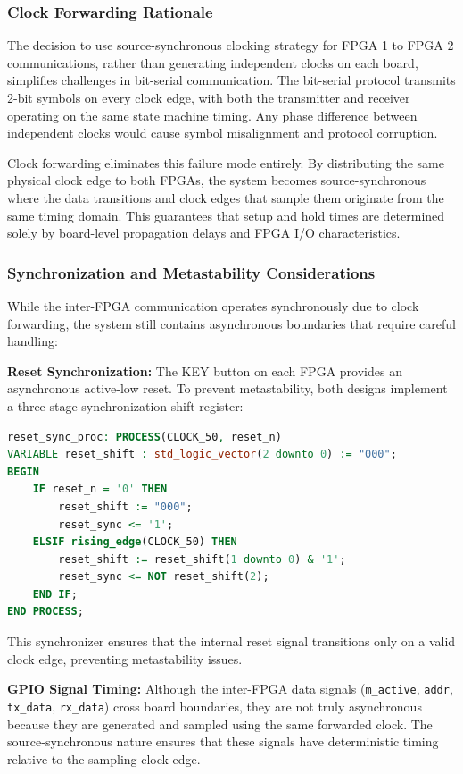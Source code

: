\documentclass[12pt]{article}
\begin{document}
\subsubsection{Clock Forwarding Rationale}
The decision to use source-synchronous clocking strategy for FPGA 1 to FPGA 2 communications, rather than generating independent clocks on each board, simplifies challenges in bit-serial communication. The bit-serial protocol transmits 2-bit symbols on every clock edge, with both the transmitter and receiver operating on the same state machine timing. Any phase difference between independent clocks would cause symbol misalignment and protocol corruption.

Clock forwarding eliminates this failure mode entirely. By distributing the same physical clock edge to both FPGAs, the system becomes source-synchronous where the data transitions and clock edges that sample them originate from the same timing domain. This guarantees that setup and hold times are determined solely by board-level propagation delays and FPGA I/O characteristics.

\subsubsection{Synchronization and Metastability Considerations}
While the inter-FPGA communication operates synchronously due to clock forwarding, the system still contains asynchronous boundaries that require careful handling:

\textbf{Reset Synchronization:} The KEY button on each FPGA provides an asynchronous active-low reset. To prevent metastability, both designs implement a three-stage synchronization shift register:

\begin{lstlisting}[language=VHDL]
reset_sync_proc: PROCESS(CLOCK_50, reset_n)
VARIABLE reset_shift : std_logic_vector(2 downto 0) := "000";
BEGIN
    IF reset_n = '0' THEN
        reset_shift := "000";
        reset_sync <= '1';
    ELSIF rising_edge(CLOCK_50) THEN
        reset_shift := reset_shift(1 downto 0) & '1';
        reset_sync <= NOT reset_shift(2);
    END IF;
END PROCESS;
\end{lstlisting}

This synchronizer ensures that the internal reset signal transitions only on a valid clock edge, preventing metastability issues.

\textbf{GPIO Signal Timing:} Although the inter-FPGA data signals (\texttt{m\_active}, \texttt{addr}, \texttt{tx\_data}, \texttt{rx\_data}) cross board boundaries, they are not truly asynchronous because they are generated and sampled using the same forwarded clock. The source-synchronous nature ensures that these signals have deterministic timing relative to the sampling clock edge.
\end{document}
